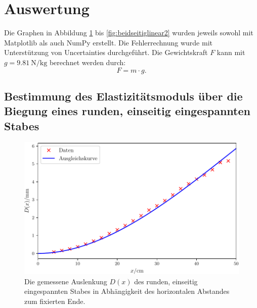 
\section{Auswertung}
\label{sec:Auswertung}
Die Graphen in Abbildung \ref{fig:rund} bis \ref{fig:beidseitiglinear2} wurden jeweils sowohl mit Matplotlib \cite{matplotlib} als auch NumPy \cite{numpy} erstellt. Die Fehlerrechnung wurde mit Unterstützung von Uncertainties \cite{uncertainties} durchgeführt.\newline 
Die Gewichtskraft $F$ kann mit $g=\SI{9.81}{\newton\per\kilogram}$ \cite{g} berechnet werden durch:
\begin{equation}
	F = m \cdot g \text{.} \label{Gewichtskraft}
\end{equation}

\subsection{Bestimmung des Elastizitätsmoduls über die Biegung eines runden, einseitig eingespannten Stabes}
\begin{figure}
	\centering
	\includegraphics[width=\linewidth-70pt,height=\textheight-70pt,keepaspectratio]{content/images/StabRundEinseitig1.pdf}
	\caption{Die gemessene Auslenkung $D(x)$ des runden, einseitig eingespannten Stabes in Abhängigkeit des horizontalen Abstandes zum fixierten Ende.}
	\label{fig:rund}
\end{figure}

